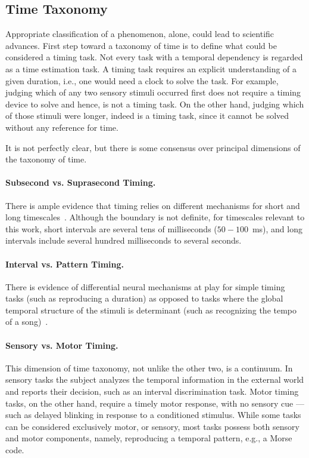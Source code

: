 \subsection[Time Taxonomy]{Time Taxonomy} \label{ch:intro:taxonomy}
Appropriate classification of a phenomenon, alone, could lead to scientific advances.\footnotemark
{}
First step toward a taxonomy of time is to define what could be considered a timing task.
Not every task with a temporal dependency is regarded as a time estimation task.
A timing task requires an explicit understanding of a given duration, i.e., one would need a clock to solve the task.
For example, judging which of any two sensory stimuli occurred first does not require a timing device to solve and hence, is not a timing task.
On the other hand, judging which of those stimuli were longer, indeed is a timing task, since it cannot be solved without any reference for time.
\par
It is not perfectly clear, but there is some consensus over principal dimensions of the taxonomy of time.

\paragraph{Subsecond vs. Suprasecond Timing.} \label{ch:intro:taxonomy:SUBvsSUPRA}
There is ample evidence that timing relies on different mechanisms for short and long timescales~\cite[see][]{Paton2018NeuronRev}.
Although the boundary is not definite, for timescales relevant to this work, short intervals are several tens of milliseconds ($50-100$~ms), and long intervals include several hundred milliseconds to several seconds.

\paragraph{Interval vs. Pattern Timing.} \label{ch:intro:taxonomy:INTvsPAT}
There is evidence of differential neural mechanisms at play for simple timing tasks (such as reproducing a duration) as  opposed to tasks where the global temporal structure of the stimuli is determinant (such as recognizing the tempo of a song)~\cite{teki2011}.

\paragraph{Sensory vs. Motor Timing.} \label{ch:intro:taxonomy:SENvsMOT}
This dimension of time taxonomy, not unlike the other two, is a continuum.
In sensory tasks the subject analyzes the temporal information in the external world and reports their decision, such as an interval discrimination task.
Motor timing tasks, on the other hand, require a timely motor response, with no sensory cue --- such as delayed blinking in response to a conditioned stimulus.
While some tasks can be considered exclusively motor, or sensory, most tasks possess both sensory and motor components, namely, reproducing a temporal pattern, e.g., a Morse code.